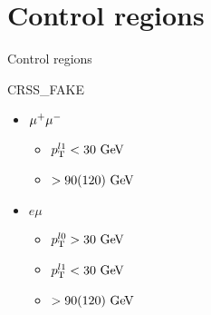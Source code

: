 \documentclass[10pt]{beamer}
\begin{document}
\section{Control regions}
\begin{frame}{Control regions}

  \begin{block}{CRSS\_FAKE}
    \begin{itemize}    
    \item $\mathrm{\mu^+ \mu^-}$
      \begin{itemize}
      \item $\pT^{l1}<30\GeV$
      \item \mljj$>90(120)\GeV$
      \end{itemize}
    \item $e\mu$
      \begin{itemize}
      \item $\pT^{l0}>30\GeV$
      \item $\pT^{l1}<30\GeV$
      \item \mljj$>90(120)\GeV$
      \end{itemize}
    \end{itemize}
  \end{block}

\end{frame}





\end{document}
